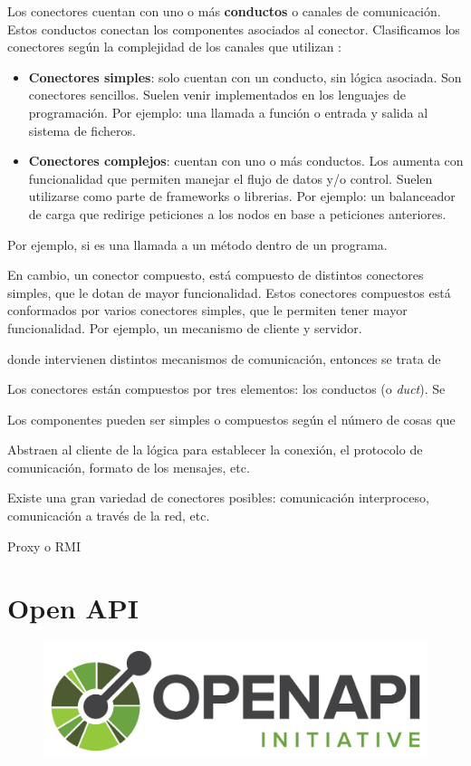 Los conectores cuentan con uno o más \textbf{conductos} o canales de comunicación. Estos conductos conectan los componentes asociados al conector. Clasificamos los conectores según la complejidad de los canales que utilizan \cite{mehtaTaxonomySoftwareConnectors2000}:

\begin{itemize}
    \item \textbf{Conectores simples}: solo cuentan con un conducto, sin lógica asociada. Son conectores sencillos. Suelen venir implementados en los lenguajes de programación. Por ejemplo: una llamada a función o entrada y salida al sistema de ficheros.

    \item \textbf{Conectores complejos}: cuentan con uno o más conductos. Los aumenta con funcionalidad que permiten manejar el flujo de datos y/o control. Suelen utilizarse como parte de frameworks o librerias. Por ejemplo: un balanceador de carga que redirige peticiones a los nodos en base a peticiones anteriores.
\end{itemize}

 Por ejemplo, si es una llamada a un método dentro de un programa.

En cambio, un conector compuesto, está compuesto de distintos conectores simples, que le dotan de mayor funcionalidad. Estos conectores compuestos está conformados por varios conectores simples, que le permiten tener mayor funcionalidad. Por ejemplo, un mecanismo de cliente y servidor.

donde intervienen distintos mecanismos de comunicación, entonces se trata de

Los conectores están compuestos por tres elementos: los conductos (o \textit{duct}). Se

Los componentes pueden ser simples o compuestos según el número de cosas que

Abstraen al cliente de la lógica para establecer la conexión, el protocolo de comunicación, formato de los mensajes, etc.

Existe una gran variedad de conectores posibles: comunicación interproceso, comunicación a través de la red, etc.

Proxy o RMI

\section{Open API}

\begin{figure}
  \vspace{15pt}
  \includegraphics[scale=0.34]{service_connectors/images/openapi-logo}
  \centering
  \vspace{15pt}
\end{figure}


